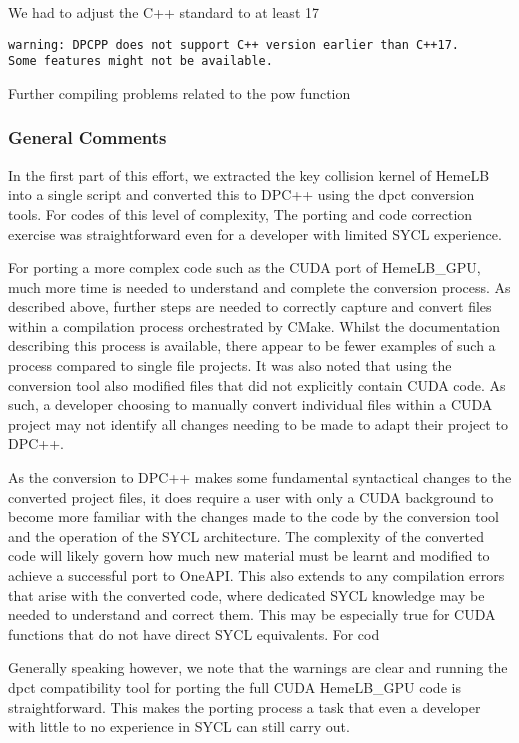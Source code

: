 \documentclass[../main]{subfiles}
\begin{document}
We had to adjust the C++ standard to at least 17
\begin{verbatim}
warning: DPCPP does not support C++ version earlier than C++17. 
Some features might not be available.
\end{verbatim}

Further compiling problems related to the pow function


\subsubsection{General Comments}
In the first part of this effort, we extracted the key collision kernel of HemeLB into a single script and converted this to DPC++ using the dpct conversion tools. For codes of this level of complexity, The porting and code correction exercise was straightforward even for a developer with limited SYCL experience.

For porting a more complex code such as the CUDA port of HemeLB\_GPU, much more time is needed to understand and complete the conversion process. As described above, further steps are needed to correctly capture and convert files within a compilation process orchestrated by CMake. Whilst the documentation describing this process is available, there appear to be fewer examples of such a process compared to single file projects. It was also noted that using the conversion tool also modified files that did not explicitly contain CUDA code. As such, a developer choosing to manually convert individual files within a CUDA project may not identify all changes needing to be made to adapt their project to DPC++.

As the conversion to DPC++ makes some fundamental syntactical changes to the converted project files, it does require a user with only a CUDA background to become more familiar with the changes made to the code by the conversion tool and the operation of the SYCL architecture. The complexity of the converted code will likely govern how much new material must be learnt and modified to achieve a successful port to OneAPI. This also extends to any compilation errors that arise with the converted code, where dedicated SYCL knowledge may be needed to understand and correct them. This may be especially true for CUDA functions that do not have direct SYCL equivalents. For cod

Generally speaking however, we note that the warnings are clear and running the dpct compatibility tool for porting the full CUDA HemeLB\_GPU code is straightforward. This makes the porting process a task that even a developer with little to no experience in SYCL can still carry out.  
\end{document}
